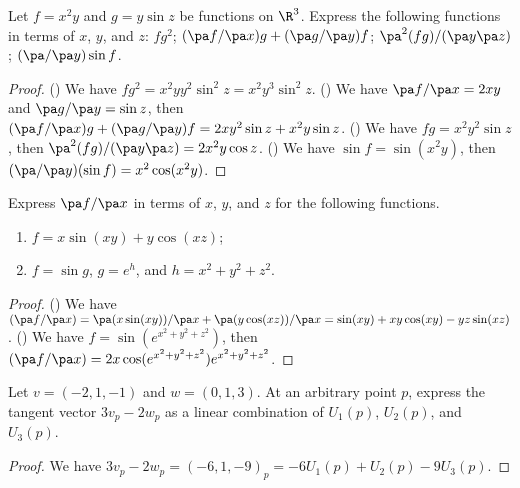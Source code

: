 \newpage
{}
\begin{exercise}[1.1.1]
    Let $f={x}^{2}y$ and $g=y\sin z$ be functions on ${\R}^{3}$. Express the following functions in terms of $x$, $y$, and $z$: $f{g}^{2}$; $(\pa f/\pa x)g+(\pa g/\pa y)f$; ${\pa}^{2}(fg)/(\pa y\pa z)$; $(\pa/\pa y)\sin f$.
\end{exercise}
\begin{proof}
    () We have $f{g}^{2}={x}^{2}y{y}^{2}{\sin}^{2}z={x}^{2}{y}^{3}{\sin}^{2}z$. () We have $\pa f/\pa x=2xy$ and $\pa g/\pa y=\sin z$, then $(\pa f/\pa x)g+(\pa g/\pa y)f=2x{y}^{2}\sin z+{x}^{2}y\sin z$. () We have $fg={x}^{2}{y}^{2}\sin z$, then ${\pa}^{2}(fg)/(\pa y\pa z)=2{x}^{2}y\cos z$. () We have $\sin f=\sin({x}^{2}y)$, then $(\pa/\pa y)(\sin f)={x}^{2}\cos({x}^{2}y)$.
\end{proof}
\begin{exercise}[1.1.3]
    Express $\pa f/\pa x$ in terms of $x$, $y$, and $z$ for the following functions.
    \begin{enumerate}
        \item $f=x\sin(xy)+y\cos(xz)$;
        \item $f=\sin g$, $g={e}^{h}$, and $h={x}^{2}+{y}^{2}+{z}^{2}$.
    \end{enumerate}
\end{exercise}
\begin{proof}
    () We have $(\pa f/\pa x)=\pa(x\sin(xy))/\pa x+\pa(y\cos(xz))/\pa x=\sin(xy)+xy\cos(xy)-yz\sin(xz)$. () We have $f=\sin({e}^{{x}^{2}+{y}^{2}+{z}^{2}})$, then $(\pa f/\pa x)=2x\cos({e}^{{x}^{2}+{y}^{2}+{z}^{2}}){e}^{{x}^{2}+{y}^{2}+{z}^{2}}$.
\end{proof}



\begin{exercise}[1.2.1]
    Let $v=(-2,1,-1)$ and $w=(0,1,3)$. At an arbitrary point $p$, express the tangent vector $3{v}_{p}-2{w}_{p}$ as a linear combination of ${U}_{1}(p)$, ${U}_{2}(p)$, and ${U}_{3}(p)$.
\end{exercise}
\begin{proof}
    We have $3{v}_{p}-2{w}_{p}={(-6,1,-9)}_{p}=-6{U}_{1}(p)+{U}_{2}(p)-9{U}_{3}(p)$.
\end{proof}


